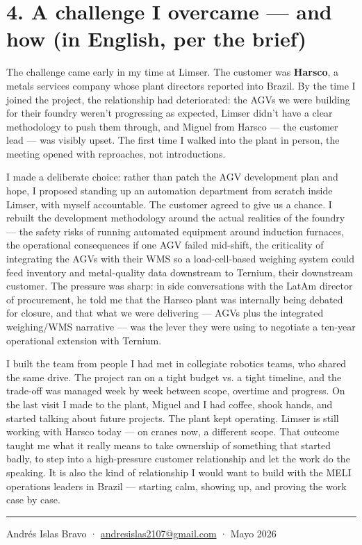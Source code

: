 \documentclass[11pt, letterpaper]{article}
\begin{document}
\section*{4. A challenge I overcame --- and how (in English, per the brief)}

The challenge came early in my time at Limser. The customer was \textbf{Harsco}, a metals services company whose plant directors reported into Brazil. By the time I joined the project, the relationship had deteriorated: the AGVs we were building for their foundry weren't progressing as expected, Limser didn't have a clear methodology to push them through, and Miguel from Harsco --- the customer lead --- was visibly upset. The first time I walked into the plant in person, the meeting opened with reproaches, not introductions.

I made a deliberate choice: rather than patch the AGV development plan and hope, I proposed standing up an automation department from scratch inside Limser, with myself accountable. The customer agreed to give us a chance. I rebuilt the development methodology around the actual realities of the foundry --- the safety risks of running automated equipment around induction furnaces, the operational consequences if one AGV failed mid-shift, the criticality of integrating the AGVs with their WMS so a load-cell-based weighing system could feed inventory and metal-quality data downstream to Ternium, their downstream customer. The pressure was sharp: in side conversations with the LatAm director of procurement, he told me that the Harsco plant was internally being debated for closure, and that what we were delivering --- AGVs plus the integrated weighing/WMS narrative --- was the lever they were using to negotiate a ten-year operational extension with Ternium.

I built the team from people I had met in collegiate robotics teams, who shared the same drive. The project ran on a tight budget vs. a tight timeline, and the trade-off was managed week by week between scope, overtime and progress. On the last visit I made to the plant, Miguel and I had coffee, shook hands, and started talking about future projects. The plant kept operating. Limser is still working with Harsco today --- on cranes now, a different scope. That outcome taught me what it really means to take ownership of something that started badly, to step into a high-pressure customer relationship and let the work do the speaking. It is also the kind of relationship I would want to build with the MELI operations leaders in Brazil --- starting calm, showing up, and proving the work case by case.

\vspace{1em}

{\centering\color{meliyellowdark}\rule{0.35\linewidth}{1.2pt}\par}
\vspace{0.4em}
{\centering\small\color{muted} Andrés Islas Bravo \;·\; \href{mailto:andresislas2107@gmail.com}{andresislas2107@gmail.com} \;·\; Mayo 2026\par}
\end{document}

